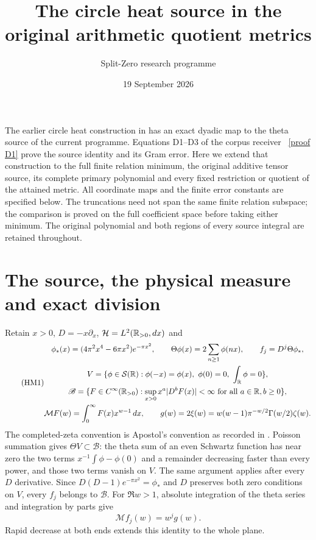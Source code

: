 \documentclass[11pt]{article}
\title{The circle heat source in the original arithmetic quotient metrics}
\author{Split-Zero research programme}
\date{19 September 2026}
\newcommand{\B}{\mathscr B}\newcommand{\M}{\mathcal M}
\begin{document}
\maketitle

The earlier circle heat construction in \cite{oldcircle} has an exact
dyadic map to the theta source of the current programme. Equations D1--D3
of the corpus receiver \cite{corpus}%
~\href{https://github.com/KokunoYumeto/zeta-function-research-reader/blob/5992ad50c0f2a06921f1fcaded7b4e38097c0739/workbenches/splitzero-tandem/continuations/20260920-original-kernel-mixed-determinants/providers/EXACT_CORPUS_RECEIVERS.tex\#L55}{[proof D1]}%
{} prove the source identity and its
Gram error. Here we extend that construction to the full finite relation
minimum, the original additive tensor source, its complete primary
polynomial and every fixed restriction or quotient of the attained metric.
All coordinate maps and the finite error constants are specified below.
The truncations need not span the same finite relation subspace; the
comparison is proved on the full coefficient space before taking either
minimum. The original polynomial and both regions of every source integral
are retained throughout.

\section{The source, the physical measure and exact division}
Retain $x>0$, $D=-x\partial_x$, $\mathcal H=L^2(\mathbb R_{>0},dx)$ and
\begin{equation}\tag{HM1}
 \begin{gathered}
 \phi_*(x)=(4\pi^2x^4-6\pi x^2)e^{-\pi x^2},\qquad
 \Theta\phi(x)=2\sum_{n\ge1}\phi(nx),\qquad f_j=D^j\Theta\phi_*,\\
 V=\{\phi\in\mathcal S(\R):\phi(-x)=\phi(x),\ \phi(0)=0,
                           \ \int_\R\phi=0\},\\
 \B=\{F\in C^\infty(\R_{>0}):
         \sup_{x>0}x^a|D^bF(x)|<\infty\text{ for all }a\in\R, b\ge0\},\\
 \M F(w)=\int_0^\infty F(x)x^{w-1}\,dx,\qquad
 g(w)=2\xi(w)=w(w-1)\pi^{-w/2}\Gamma(w/2)\zeta(w).
 \end{gathered}
\end{equation}
The completed-zeta convention is Apostol's convention as recorded in
\cite{DLMF25}. Poisson summation gives $\Theta V\subset\B$:
the theta sum of an even Schwartz function has near zero the two terms
$x^{-1}\int\phi-\phi(0)$ and a remainder decreasing faster than every
power, and those two terms vanish on $V$. The same argument applies after
every $D$ derivative. Since $D(D-1)e^{-\pi x^2}=\phi_*$ and $D$ preserves
both zero conditions on $V$, every $f_j$ belongs to $\B$.
For $\Re w>1$, absolute integration of the theta series and integration
by parts give
\begin{equation}\tag{HM2}
 \M f_j(w)=w^j g(w).
\end{equation}
Rapid decrease at both ends extends this identity to the whole plane.
\end{document}

